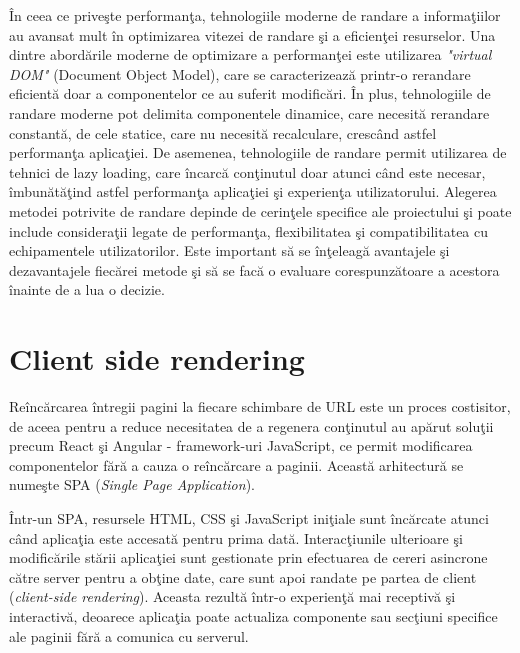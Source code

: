 \documentclass[12pt, a4paper]{report}
\begin{document}
\^ In ceea ce prive\c ste performan\c ta, tehnologiile moderne de randare a informa\c tiilor au avansat mult \^ in optimizarea vitezei de randare \c si a eficien\c tei resurselor. Una dintre abord\u arile moderne de optimizare a performan\c tei este utilizarea \emph{"virtual DOM"} (Document Object Model), care se caracterizeaz\u a printr-o rerandare eficient\u a doar a componentelor ce au suferit modific\u ari.
\^ In plus, tehnologiile de randare moderne pot delimita componentele dinamice, care necesit\u a rerandare constant\u a, de cele statice, care nu necesit\u a recalculare, cresc\^ and astfel performan\c ta aplica\c tiei. De asemenea, tehnologiile de randare permit utilizarea de tehnici de lazy loading, care \^ incarc\u a con\c tinutul doar atunci c\^ and este necesar, \^ imbun\u at\u a\c tind astfel performan\c ta aplica\c tiei \c si experien\c ta utilizatorului. \cite{virtual-dom}
Alegerea metodei potrivite de randare depinde de cerin\c tele specifice ale proiectului \c si poate include considera\c tii legate de performan\c ta, flexibilitatea \c si compatibilitatea cu echipamentele utilizatorilor. Este important s\u a se \^ in\c teleag\u a avantajele \c si dezavantajele fiec\u arei metode \c si s\u a se fac\u a o evaluare corespunz\u atoare a acestora \^ inainte de a lua o decizie.


\section{Client side rendering}

Re\^ inc\u arcarea \^ intregii pagini la fiecare schimbare de URL este un proces costisitor, de aceea pentru a reduce necesitatea de a regenera con\c tinutul au ap\u arut solu\c tii precum React \c si Angular - framework-uri JavaScript, ce permit modificarea componentelor f\u ar\u a a cauza o re\^ inc\u arcare a paginii. Aceast\u a arhitectur\u a se nume\c ste SPA (\textit{Single Page Application}).

\^Intr-un SPA, resursele HTML, CSS \c si JavaScript ini\c tiale sunt \^inc\u arcate atunci c\^and aplica\c tia este accesat\u a pentru prima dat\u a. Interac\c tiunile ulterioare \c si modific\u arile st\u arii aplica\c tiei sunt gestionate prin efectuarea de cereri asincrone c\u atre server pentru a ob\c tine date, care sunt apoi randate pe partea de client (\textit{client-side rendering}). Aceasta rezult\u a \^intr-o experien\c t\u a mai receptiv\u a \c si interactiv\u a, deoarece aplica\c tia poate actualiza componente sau sec\c tiuni specifice ale paginii f\u ar\u a a comunica cu serverul.
\end{document}
